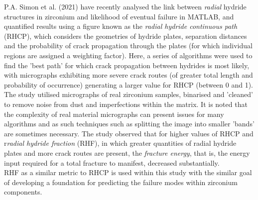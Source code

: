 \documentclass{article}
\begin{document}
	P.A. Simon et al. (2021) \cite{Simon2021} have recently analysed the link between \textit{radial} hydride structures in zirconium and likelihood of eventual failure in MATLAB, and quantified results using a figure known as the \textit{radial hydride continuous path} (RHCP), which considers the geometries of hydride plates, separation distances and the probability of crack propagation through the plates (for which individual regions are assigned a weighting factor). Here, a series of algorithms were used to find the 'best path' for which crack propagation between hydrides is most likely, with micrographs exhibiting more severe crack routes (of greater total length and probability of occurrence) generating a larger value for RHCP (between 0 and 1). The study utilised micrographs of real zirconium samples, binarised and 'cleaned' to remove noise from dust and imperfections within the matrix. It is noted that the complexity of real material micrographs can present issues for many algorithms and as such techniques such as splitting the image into smaller 'bands' are sometimes necessary. The study observed that for higher values of RHCP and r\textit{radial hydride fraction} (RHF), in which greater quantities of radial hydride plates and more crack routes are present, the \textit{fracture energy}, that is, the energy input required for a total fracture to manifest, decreased substantially.
	\\
	RHF as a similar metric to RHCP is used within this study with the similar goal of developing a foundation for predicting the failure modes within zirconium components.
	\\
\end{document}
